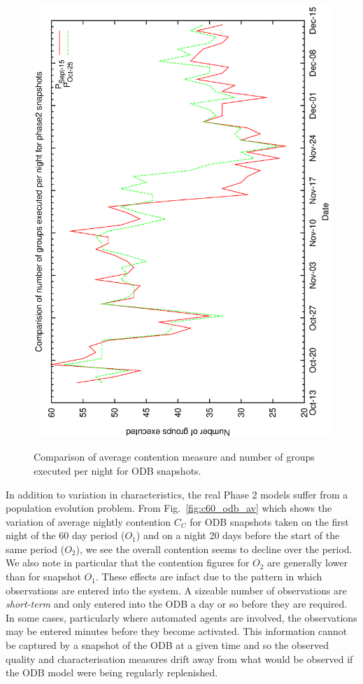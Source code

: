 \begin{figure}[h]
\begin{center}
{   \includegraphics[scale=0.5, angle=-90]{figures/c60_odb_ng.eps}  
   \label{fig:c60_odb_ng}
  }
  \caption{Comparison of average contention measure and number of groups executed per night for ODB snapshots.}
 \end{center}
\end{figure}

In addition to variation in characteristics, the real Phase 2 models suffer from a population evolution problem. From  Fig.~\ref{fig:c60_odb_av} which shows the variation of average nightly contention $C_C$ for ODB snapshots taken on the first night of the 60 day period ($O_1$) and on a night 20 days before the start of the same period ($O_2$), we see the overall contention seems to decline over the period. We also note in particular that the contention figures for $O_2$ are generally lower than for snapshot $O_1$. These effects are infact due to the pattern in which observations are entered into the system. A sizeable number of observations are \emph{short-term} and only entered into the ODB a day or so before they are required. In some cases, particularly where automated agents are involved, the observations may be entered minutes before they become activated. This information cannot be captured by a snapshot of the ODB at a given time and so the observed quality and characterisation measures drift away from what would be observed if the ODB model were being regularly replenished.

